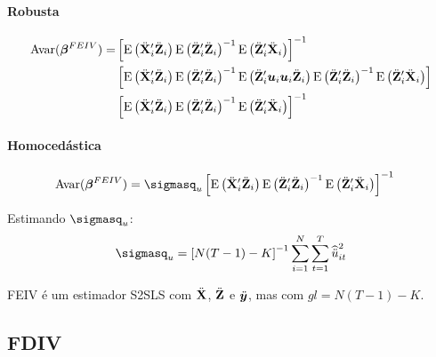\documentclass[11pt, oneside, a4paper, article]{article}
\numberwithin{equation}{section}
\begin{document}
\begin{description}
\paragraph{Robusta}
\begin{align*}
\text{Avar}(\boldsymbol{\beta}^{FEIV}) = & 
\left[ 
\text{E}\left( \ddot{\mathbf{X}}_{i}' \ddot{\mathbf{Z}}_{i} \right)
\text{E}\left( \ddot{\mathbf{Z}}_{i}' \ddot{\mathbf{Z}}_{i} \right)^{-1}
\text{E}\left( \ddot{\mathbf{Z}}_{i}' \ddot{\mathbf{X}}_{i} \right)
\right]^{-1}
\\ &
\left[ 
\text{E}\left( \ddot{\mathbf{X}}_{i}' \ddot{\mathbf{Z}}_{i} \right)
\text{E}\left( \ddot{\mathbf{Z}}_{i}' \ddot{\mathbf{Z}}_{i} \right)^{-1}
\text{E}\left( \ddot{\mathbf{Z}}_{i}' \boldsymbol{u}_{i} \boldsymbol{u}_{i} \ddot{\mathbf{Z}}_{i} \right)
\text{E}\left( \ddot{\mathbf{Z}}_{i}' \ddot{\mathbf{Z}}_{i} \right)^{-1}
\text{E}\left( \ddot{\mathbf{Z}}_{i}' \ddot{\mathbf{X}}_{i} \right)
\right]
\\ &
\left[ 
\text{E}\left( \ddot{\mathbf{X}}_{i}' \ddot{\mathbf{Z}}_{i} \right)
\text{E}\left( \ddot{\mathbf{Z}}_{i}' \ddot{\mathbf{Z}}_{i} \right)^{-1}
\text{E}\left( \ddot{\mathbf{Z}}_{i}' \ddot{\mathbf{X}}_{i} \right)
\right]^{-1}
\end{align*}

\paragraph{Homocedástica}
\begin{align*}
\Avar(\betavec^{FEIV}) & = 
\sigmasq_{u}
\left[ 
\E\left( \ddot{\Xmat}_{i}' \ddot{\Zmat}_{i} \right)
\E\left( \ddot{\Zmat}_{i}' \ddot{\Zmat}_{i} \right)^{-1}
\E\left( \ddot{\Zmat}_{i}' \ddot{\Xmat}_{i} \right)
\right]^{-1}
\end{align*}

\noindent
Estimando $\sigmasq_{u}$:
\begin{align*}
	\sigmasq_{u} = \left[ N(T-1) -K \right]^{-1} \sum_{i=1}^{N} \sum_{t=1}^{T} \widehat{\ddot{u}}^{2}_{it}
\end{align*}

\begin{obs}
	FEIV é um estimador S2SLS com $\ddot {\mathbf{X}}$, $\ddot {\mathbf{Z}}$ e $\ddot {\boldsymbol{y}}$, mas com $gl= N(T-1) - K$.	
\end{obs}

\clearpage
\subsection{FDIV}


\end{description}
\end{document}
